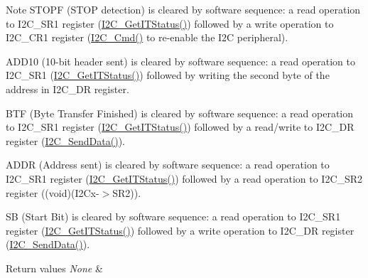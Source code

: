 \begin{DoxyNote}{Note}
S\+T\+O\+PF (S\+T\+OP detection) is cleared by software sequence\+: a read operation to I2\+C\+\_\+\+S\+R1 register (\mbox{\hyperlink{group___i2_c___group5_ga447771fbbd94a56f3570b9f430a069ba}{I2\+C\+\_\+\+Get\+I\+T\+Status()}}) followed by a write operation to I2\+C\+\_\+\+C\+R1 register (\mbox{\hyperlink{group___i2_c___group1_ga7e1323c9133c2cb424dfb5b10b7d2f0b}{I2\+C\+\_\+\+Cmd()}} to re-\/enable the I2C peripheral). 

A\+D\+D10 (10-\/bit header sent) is cleared by software sequence\+: a read operation to I2\+C\+\_\+\+S\+R1 (\mbox{\hyperlink{group___i2_c___group5_ga447771fbbd94a56f3570b9f430a069ba}{I2\+C\+\_\+\+Get\+I\+T\+Status()}}) followed by writing the second byte of the address in I2\+C\+\_\+\+DR register. 

B\+TF (Byte Transfer Finished) is cleared by software sequence\+: a read operation to I2\+C\+\_\+\+S\+R1 register (\mbox{\hyperlink{group___i2_c___group5_ga447771fbbd94a56f3570b9f430a069ba}{I2\+C\+\_\+\+Get\+I\+T\+Status()}}) followed by a read/write to I2\+C\+\_\+\+DR register (\mbox{\hyperlink{group___i2_c___group2_ga7bd9e70b8eafde0dd5eb42b0d95fe1a9}{I2\+C\+\_\+\+Send\+Data()}}). 

A\+D\+DR (Address sent) is cleared by software sequence\+: a read operation to I2\+C\+\_\+\+S\+R1 register (\mbox{\hyperlink{group___i2_c___group5_ga447771fbbd94a56f3570b9f430a069ba}{I2\+C\+\_\+\+Get\+I\+T\+Status()}}) followed by a read operation to I2\+C\+\_\+\+S\+R2 register ((void)(I2\+Cx-\/$>$S\+R2)). 

SB (Start Bit) is cleared by software sequence\+: a read operation to I2\+C\+\_\+\+S\+R1 register (\mbox{\hyperlink{group___i2_c___group5_ga447771fbbd94a56f3570b9f430a069ba}{I2\+C\+\_\+\+Get\+I\+T\+Status()}}) followed by a write operation to I2\+C\+\_\+\+DR register (\mbox{\hyperlink{group___i2_c___group2_ga7bd9e70b8eafde0dd5eb42b0d95fe1a9}{I2\+C\+\_\+\+Send\+Data()}}). 
\end{DoxyNote}

\begin{DoxyRetVals}{Return values}
{\em None} & \\
\hline
\end{DoxyRetVals}
\mbox{\label{group___i2_c___group5_ga15c95d0ed124f029621a2061b1677ee7}} 
